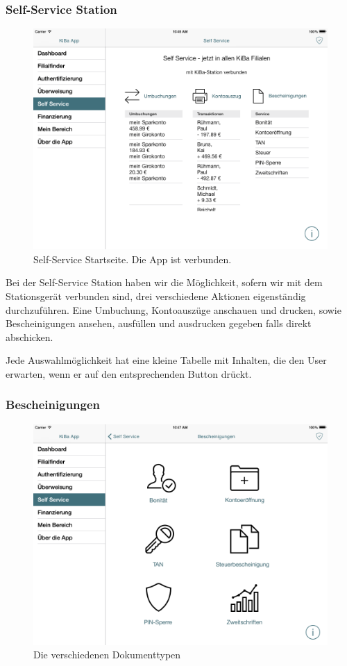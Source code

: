 \subsubsection{Self-Service Station}
\begin{figure}[h]
	\centering
  \includegraphics[scale=0.4]{Pictures/SSverbunden}
	\caption{Self-Service Startseite. Die App ist verbunden.}
	\label{fig5}
\end{figure}

	Bei der Self-Service Station haben wir die Möglichkeit, sofern wir mit dem Stationsgerät verbunden sind, drei verschiedene Aktionen eigenständig durchzuführen. Eine Umbuchung, Kontoauszüge anschauen und drucken, sowie Bescheinigungen ansehen, ausfüllen und ausdrucken gegeben falls direkt abschicken.

	Jede Auswahlmöglichkeit hat eine kleine Tabelle mit Inhalten, die den User erwarten, wenn er auf den entsprechenden Button drückt.

\subsubsection{Bescheinigungen}
\begin{figure}[h]
	\centering
  \includegraphics[scale=0.4]{Pictures/Bescheinigungen}
	\caption{Die verschiedenen Dokumenttypen}
	\label{fig6}
\end{figure}

